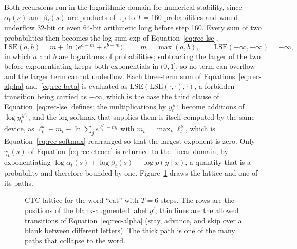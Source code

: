 Both recursions run in the logarithmic domain for numerical stability, since $\alpha_t(s)$ and $\beta_t(s)$ are products of up to $T=160$ probabilities and would underflow 32-bit or even 64-bit arithmetic long before step 160.
Every sum of two probabilities then becomes the log-sum-exp of Equation~\ref{eq:rec-lse},
\begin{equation}
\mathrm{LSE}(a,b)=m+\ln\bigl(e^{a-m}+e^{b-m}\bigr),\qquad m=\max(a,b),\qquad \mathrm{LSE}(-\infty,-\infty)=-\infty,
\label{eq:rec-lse}
\end{equation}
in which $a$ and $b$ are logarithms of probabilities; subtracting the larger of the two before exponentiating keeps both exponentials in $(0,1]$, so no term can overflow and the larger term cannot underflow.
Each three-term sum of Equations~\ref{eq:rec-alpha} and~\ref{eq:rec-beta} is evaluated as $\mathrm{LSE}(\mathrm{LSE}(\cdot,\cdot),\cdot)$, a forbidden transition being carried as $-\infty$, which is the case the third clause of Equation~\ref{eq:rec-lse} defines; the multiplications by $y_t^{\,y'_s}$ become additions of $\log y_t^{\,y'_s}$, and the log-softmax that supplies them is itself computed by the same device, as $\ell_t^k-m_t-\ln\sum_je^{\ell_t^j-m_t}$ with $m_t=\max_k\ell_t^k$, which is Equation~\ref{eq:rec-softmax} rearranged so that the largest exponent is zero.
Only $\gamma_t(s)$ of Equation~\ref{eq:rec-ctcocc} is returned to the linear domain, by exponentiating $\log\alpha_t(s)+\log\beta_t(s)-\log p(y\mid x)$, a quantity that is a probability and therefore bounded by one.
Figure~\ref{fig:rec-ctc} draws the lattice and one of its paths.

\begin{figure}[h]
\centering
{}
\caption{CTC lattice for the word ``cat'' with $T=6$ steps. The rows are the positions of the blank-augmented label $y'$; thin lines are the allowed transitions of Equation~\ref{eq:rec-alpha} (stay, advance, and skip over a blank between different letters). The thick path is one of the many paths that collapse to the word.}
\label{fig:rec-ctc}
\end{figure}

